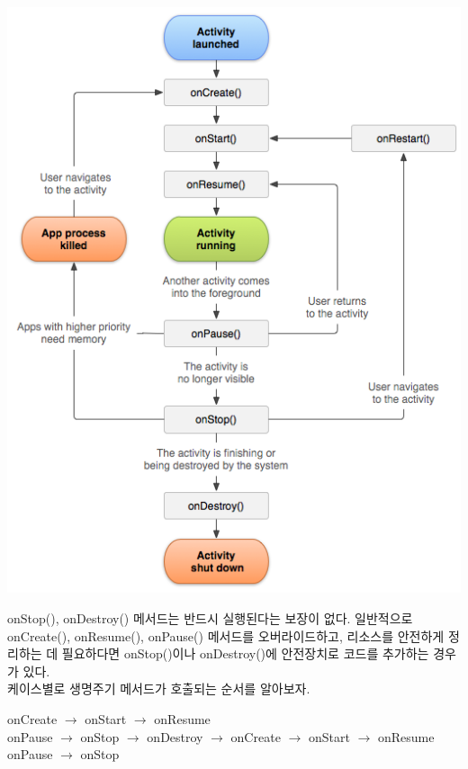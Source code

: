 \includegraphics[scale=0.5]{activity-lifecycle}

onStop(), onDestroy() 메서드는 반드시 실행된다는 보장이 없다. 일반적으로 onCreate(), onResume(), onPause() 메서드를 오버라이드하고, 리소스를 안전하게 정리하는 데 필요하다면 onStop()이나 onDestroy()에 안전장치로 코드를 추가하는 경우가 있다.\\

케이스별로 생명주기 메서드가 호출되는 순서를 알아보자.\label{flow}

onCreate $\rightarrow$ onStart $\rightarrow$ onResume\\

onPause $\rightarrow$ onStop $\rightarrow$ onDestroy $\rightarrow$ onCreate $\rightarrow$ onStart $\rightarrow$ onResume\\

onPause $\rightarrow$ onStop\\

